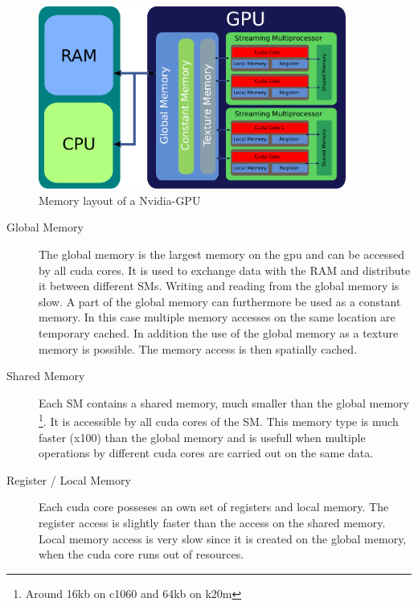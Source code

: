 \begin{figure}[!tbp]
      \centering
        \includegraphics[width=0.9\textwidth]{gfx/cuda/gpu.pdf}
          \caption{Memory layout of a Nvidia-GPU}
    \label{fig:gpu_memory_layout}
\end{figure}

\begin{description}
    \item[Global Memory] The global memory is the largest memory on the gpu and can be accessed by all cuda cores.
                         It is  used to exchange data with the RAM and distribute it between different SMs.
                         Writing and reading from the global memory is slow. A part of the global memory can furthermore be used as a constant memory.
                         In this case multiple memory accesses on the same location are temporary cached.
                         In addition the use of the global memory as a texture memory is possible. The memory access is then spatially cached.


    \item[Shared Memory] Each SM contains a shared memory, much smaller than the global memory \footnote{Around 16kb on c1060 and 64kb on k20m}. It is accessible
                         by all cuda cores of the SM.
                         This memory type is much faster (x100) than the global memory and is usefull when multiple operations
                         by different cuda cores are carried out on the same data.

    \item[Register / Local Memory] Each cuda core posseses an own set of registers and local memory.
                                   The register access is slightly faster than the access  on the shared memory.
                                   Local memory access is very slow since
                                   it is created on the global memory, when the cuda core runs out of resources.
\end{description}

